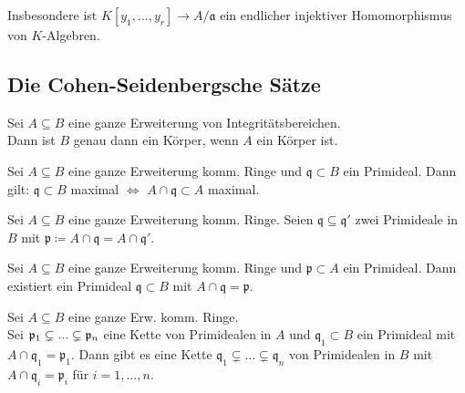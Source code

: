 \documentclass{cheat-sheet}
\newcommand{\aaa}{\mathfrak{a}}
\newcommand{\ppp}{\mathfrak{p}}
\newcommand{\qqq}{\mathfrak{q}}
\begin{document}
\begin{bem}
  Insbesondere ist $K[y_1, \ldots, y_r] \to A/\aaa$ ein endlicher injektiver Homomorphismus von $K$-Algebren.
\end{bem}

\subsection{Die Cohen-Seidenbergsche Sätze}


\begin{prop}
  Sei $A \subseteq B$ eine ganze Erweiterung von Integritätsbereichen. \\
  Dann ist $B$ genau dann ein Körper, wenn $A$ ein Körper ist.
\end{prop}

\begin{kor}
  Sei $A \subseteq B$ eine ganze Erweiterung komm. Ringe und $\qqq \subset B$ ein Primideal.
  Dann gilt: \enspace
  $\qqq \subset B$ maximal $\iff$ $A \cap \qqq \subset A$ maximal.
\end{kor}


\begin{kor}
  Sei $A \subseteq B$ eine ganze Erweiterung komm. Ringe.
  Seien $\qqq \subseteq \qqq'$ zwei Primideale in $B$ mit $\ppp \coloneqq A \cap \qqq = A \cap \qqq'$.
\end{kor}

\begin{satz}
  Sei $A \subseteq B$ eine ganze Erweiterung komm. Ringe und $\ppp \subset A$ ein Primideal.
  Dann existiert ein Primideal $\qqq \subset B$ mit $A \cap \qqq = \ppp$.
\end{satz}

\begin{satz}["`Going up"']
  Sei $A \subseteq B$ eine ganze Erw. komm. Ringe. \\
  Sei $\ppp_1 \subsetneq \nldots \subsetneq \ppp_n$ eine Kette von Primidealen in $A$ und $\qqq_1 \subset B$ ein Primideal mit $A \cap \qqq_1 = \ppp_1$.
  Dann gibt es eine Kette $\qqq_1 \subsetneq \ldots \subsetneq \qqq_n$ von Primidealen in $B$ mit $A \cap \qqq_i = \ppp_i$ für $i = 1, \ldots, n$.
\end{satz}


\end{document}
